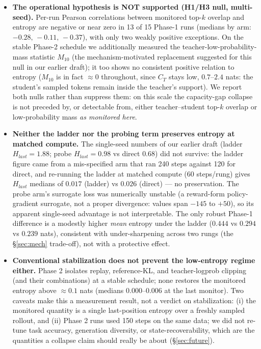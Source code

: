 \documentclass[11pt]{article}
\begin{document}
\begin{itemize}
  \item \textbf{The operational hypothesis is NOT supported (H1/H3 null, multi-seed).} Per-run Pearson correlations between monitored top-$k$ overlap and entropy are negative or near zero in 13 of 15 Phase-1 runs (medians by arm: $-0.28,\,-0.11,\,-0.37$), with only two weakly positive exceptions. On the stable Phase-2 schedule we additionally measured the teacher-low-probability-mass statistic $M_{10}$ (the mechanism-motivated replacement suggested for this null in our earlier draft); it too shows no consistent positive relation to entropy ($M_{10}$ is in fact $\approx0$ throughout, since $C_T$ stays low, $0.7$--$2.4$ nats: the student's sampled tokens remain inside the teacher's support). We report both nulls rather than suppress them: on this scale the capacity-gap collapse is not preceded by, or detectable from, either teacher--student top-$k$ overlap or low-probability mass \emph{as monitored here}.
  \item \textbf{Neither the ladder nor the probing term preserves entropy at matched compute.} The single-seed numbers of our earlier draft (ladder $H_{last}{=}1.88$; probe $H_{last}{=}0.98$ vs direct $0.68$) did not survive: the ladder figure came from a mis-specified arm that ran 240 steps against 120 for direct, and re-running the ladder at matched compute (60 steps/rung) gives $H_{last}$ medians of $0.017$ (ladder) vs $0.026$ (direct) --- no preservation. The probe arm's surrogate loss was numerically unstable (a reward-form policy-gradient surrogate, not a proper divergence: values span $-145$ to $+50$), so its apparent single-seed advantage is not interpretable. The only robust Phase-1 difference is a modestly higher \emph{mean} entropy under the ladder ($0.444$ vs $0.294$ vs $0.239$ nats), consistent with under-sharpening across two rungs (the \S\ref{sec:mech} trade-off), not with a protective effect.
  \item \textbf{Conventional stabilization does not prevent the low-entropy regime either.} Phase 2 isolates replay, reference-KL, and teacher-logprob clipping (and their combinations) at a stable schedule; none restores the monitored entropy above $\approx0.1$ nats (medians $0.000$--$0.006$ at the last monitor). Two caveats make this a measurement result, not a verdict on stabilization: (i) the monitored quantity is a single last-position entropy over a freshly sampled rollout, and (ii) Phase 2 runs used 150 steps on the same data; we did not re-tune task accuracy, generation diversity, or state-recoverability, which are the quantities a collapse claim should really be about (\S\ref{sec:future}).

\end{itemize}
\end{document}
